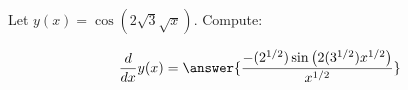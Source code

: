 \documentclass{ximera}
\begin{document}
\begin{exercise}
Let $y(x) = \cos \left(2 \sqrt{3} \sqrt{x}\right)$. Compute:

\[
\dd{x}y(x)
=\answer{\frac{-(2^{1/2})\sin \left(2 (3^{1/2}) x^{1/2}\right)}{x^{1/2} }}
\]
\end{exercise}
\end{document}
